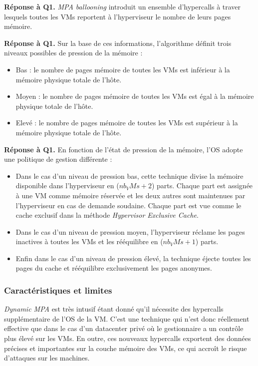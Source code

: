 \par{\textbf{Réponse à Q1.}} \textit{MPA ballooning} introduit un ensemble d'hypercalls à traver lesquels toutes les VMs reportent à l'hyperviseur le nombre de leurs pages mémoire. 
\par{\textbf{Réponse à Q1.}} Sur la base de ces informations, l'algorithme définit trois niveaux possibles de pression de la mémoire : 
\begin{itemize}
    \item Bas : le nombre de pages mémoire de toutes les VMs est inférieur à la mémoire physique totale de l'hôte.
    \item Moyen : le nombre de pages mémoire de toutes les VMs est égal à la mémoire physique totale de l'hôte.
    \item Elevé : le nombre de pages mémoire de toutes les VMs est supérieur à la mémoire physique totale de l'hôte.
\end{itemize}

\par{\textbf{Réponse à Q1.}} En fonction de l'état de pression de la mémoire, l'OS adopte une politique de gestion différente : 
\begin{itemize}
    \item Dans le cas d'un niveau de pression bas, cette technique divise la mémoire disponible dans l'hyperviseur en ($nb_VMs + 2$) parts. Chaque part est assignée à une VM comme mémoire réservée et les deux autres sont maintenues par l'hyperviseur en cas de demande soudaine. Chaque part est vue comme le cache exclusif dans la méthode \textit{Hypervisor Exclusive Cache}.
    \item Dans le cas d'un niveau de pression moyen, l'hyperviseur réclame les pages inactives à toutes les VMs et les rééquilibre en ($nb_VMs + 1$) parts.
    \item Enfin dans le cas d'un niveau de pression élevé, la technique éjecte toutes les pages du cache et rééquilibre exclusivement les pages anonymes.
\end{itemize}

\subsubsection{Caractéristiques et limites}
\textit{Dynamic MPA} est très intusif étant donné qu'il nécessite des hypercalls supplémentaire de l'OS de la VM. C'est une technique qui n'est donc réellement effective que dans le cas d'un datacenter privé où le gestionnaire a un contrôle plus élevé sur les VMs. En outre, ces nouveaux hypercalls exportent des données précises et importantes sur la couche mémoire des VMs, ce qui accroît le risque d'attaques sur les machines.